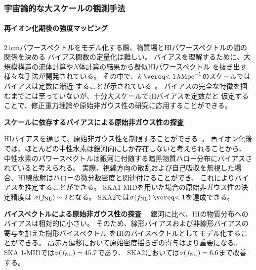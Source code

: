 \subsubsection{宇宙論的な大スケールの観測手法}

\paragraph{再イオン化期後の強度マッピング}

$21$cmパワースペクトルをモデル化する際、物質場とHIパワースペクトルの間の関係を決める
バイアス関数の定量化は難しい。
バイアスを理解するために、大規模構造の流体計算や$N$体計算の結果から擬似HIパワースペクトル
を抜き出す様々な手法が開発されている。
その中で、$k\lesssim 1\,h{\rm Mpc}^{-1}$のスケールではバイアスは定数に漸近
することが示されている~\citep{Villaescusa-Navarro:2014cma}。
バイアスの完全な特徴を掴むまでには至っていないが、十分大スケールでHIバイアスを定数だと
仮定することで、修正重力理論や原始非ガウス性の研究に応用することができる。

\begin{description}
\item {\bf スケールに依存するバイアスによる原始非ガウス性の探査　}

HIバイアスを通じて、原始非ガウス性を制限することができる~\citep{Camera:2013kpa}。
再イオン化後では、ほとんどの中性水素は銀河内にしか存在しないと考えられることから、
中性水素のパワースペクトルは銀河に付随する暗黒物質ハロー分布にバイアスされていると考えられる。
実際、視線方向の散乱および自己吸収を無視した場合、HI線放射はハローの微分数密度と関連付けることができ、
これによりバイアスを推定することができる。
SKA1-MIDを用いた場合の原始非ガウス性の決定精度は
$\sigma (f_{\rm NL})\sim 2$となる。
SKA2では$\sigma (f_{\rm NL})\lesssim 1$を達成できる。

\item {\bf バイスペクトルによる原始非ガウス性の探査　}
銀河に比べ、HIの物質分布へのバイアスは相対的に小さい。
そのため、線形バイアスおよび非線形バイアスの寄与を加えた樹形バイスペクトル
をHIのバイスペクトルとしてモデル化することができる。
高赤方偏移において原始密度揺らぎの寄与はより重要になる。
SKA 1-MIDでは$\sigma (f_{\rm NL})=45.7$であり、
SKA2においては$\sigma (f_{\rm NL})=6.6$まで改善する。
\end{description}


